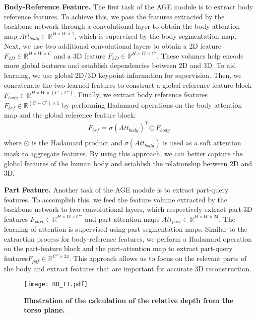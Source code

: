 \documentclass[10pt,twocolumn,letterpaper]{article}
\begin{document}
\noindent\textbf{Body-Reference Feature.}
The first task of the AGE module is to extract body reference features. To achieve this, we pass the features extracted by the backbone network through a convolutional layer to obtain the body attention map $Att_{body}\in \mathbb{R}^{H\times W\times 1}$, which is supervised by the body segmentation map. Next, we use two additional convolutional layers to obtain a 2D feature $F_{2D}\in \mathbb{R}^{H\times W\times C}$ and a 3D feature $F_{3D}\in \mathbb{R} ^{H\times W\times C'}$. These volumes help encode more global features and establish dependencies between 2D and 3D. To aid learning, we use global 2D/3D keypoint information for supervision. Then, we concatenate the two learned features to construct a global reference feature block $F_{body}\in \mathbb{R}^{H\times W\times (C+C')}$. Finally, we extract body reference features $F_{brf}\in \mathbb{R}^{(C+C')\times 1}$ by performing Hadamard operations on the body attention map and the global reference feature block:
\begin{equation}
\begin{aligned}
  {F_{brf}}=\sigma({{Att}_{body}})^{T} \odot {{F_{body}}}\\
\end{aligned}
\end{equation}
where $\odot$ is the Hadamard product and $\sigma(Att_{body})$ is used as a soft attention mask to aggregate features. By using this approach, we can better capture the global features of the human body and establish the relationship between 2D and 3D.

\noindent\textbf{Part Feature.}
Another task of the AGE module is to extract part-query features. To accomplish this, we feed the feature volume extracted by the backbone network to two convolutional layers, which respectively extract part-3D features $F_{part}\in \mathbb{R}^{H\times W\times C''}$ and part-attention maps $Att_{part}\in \mathbb{R}^{H\times W\times 24}$. The learning of attention is supervised using part-segmentation maps. Similar to the extraction process for body-reference features, we perform a Hadamard operation on the part-feature block and the part-attention map to extract part-query features$F_{pqf}\in \mathbb{R}^{C''\times 24}$. This approach allows us to focus on the relevant parts of the body and extract features that are important for accurate 3D reconstruction.

\begin{figure}
  \centering
  \texttt{[image: RD\_TT.pdf]}
  \vspace{-1em}
  \caption{\noindent\textbf{Illustration of the calculation of the relative depth from the torso plane.} }
  \label{rp}
\end{figure}
\end{document}
